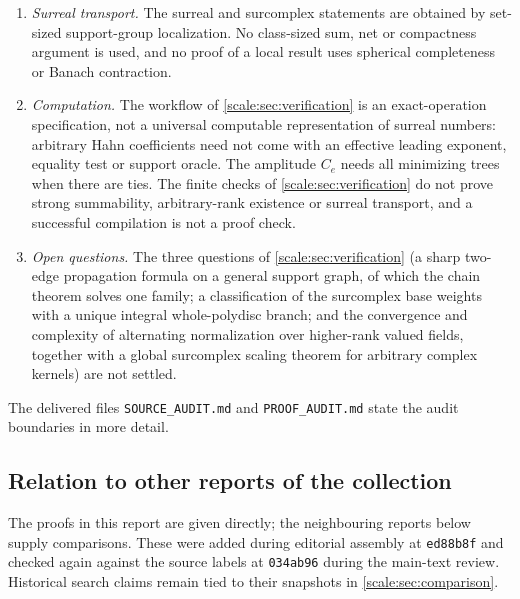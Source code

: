 \documentclass[11pt,a4paper]{article}
\numberwithin{equation}{section}
\theoremstyle{definition}
\begin{document}
\begin{enumerate}[label=(N\arabic*),leftmargin=3.2em]
constant constraint matrix. The same basis-cost formula is not asserted for a
Hahn-valued constraint matrix.
\item \emph{Surreal transport.} The surreal and surcomplex statements are
obtained by set-sized support-group localization. No class-sized sum, net or
compactness argument is used, and no proof of a local result uses spherical
completeness or Banach contraction.
\item \emph{Computation.} The workflow of \cref{scale:sec:verification} is an
exact-operation specification, not a universal computable representation of
surreal numbers: arbitrary Hahn coefficients need not come with an effective
leading exponent, equality test or support oracle. The amplitude $C_e$ needs
all minimizing trees when there are ties. The finite checks of
\cref{scale:sec:verification} do not prove strong summability, arbitrary-rank
existence or surreal transport, and a successful compilation is not a proof
check.
\item \emph{Open questions.} The three questions of \cref{scale:sec:verification}
(a sharp two-edge propagation formula on a general support graph, of which the
chain theorem solves one family; a classification of the surcomplex base
weights with a unique integral whole-polydisc branch; and the convergence and
complexity of alternating normalization over higher-rank valued fields,
together with a global surcomplex scaling theorem for arbitrary complex
kernels) are not settled.
\end{enumerate}
The delivered files \texttt{SOURCE\_AUDIT.md} and \texttt{PROOF\_AUDIT.md}
state the audit boundaries in more detail.

\subsection{Relation to other reports of the collection}\label{scale:sec:neighbours}
The proofs in this report are given directly; the neighbouring reports below
supply comparisons. These were added during editorial assembly at
\texttt{ed88b8f} and checked again against the source labels at
\texttt{034ab96} during the main-text review. Historical search claims
remain tied to their snapshots in \cref{scale:sec:comparison}.
\end{document}

